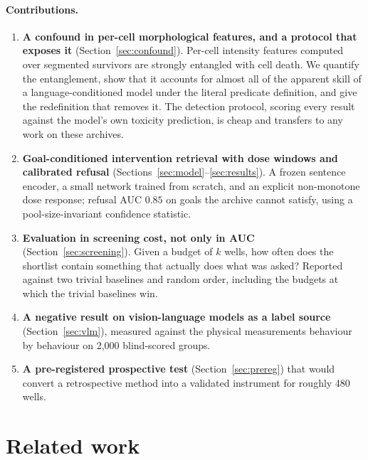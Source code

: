 \documentclass[11pt]{article}
\begin{document}
\paragraph{Contributions.}
\begin{enumerate}\itemsep0.2em
\item \textbf{A confound in per-cell morphological features, and a protocol that
exposes it} (Section~\ref{sec:confound}). Per-cell intensity features computed over
segmented survivors are strongly entangled with cell death. We quantify the
entanglement, show that it accounts for almost all of the apparent skill of a
language-conditioned model under the literal predicate definition, and give the
redefinition that removes it. The detection protocol, scoring every result against the
model's own toxicity prediction, is cheap and transfers to any work on these archives.
\item \textbf{Goal-conditioned intervention retrieval with dose windows and calibrated
refusal} (Sections~\ref{sec:model}--\ref{sec:results}). A frozen sentence encoder, a
small network trained from scratch, and an explicit non-monotone dose response; refusal
AUC $0.85$ on goals the archive cannot satisfy, using a pool-size-invariant confidence
statistic.
\item \textbf{Evaluation in screening cost, not only in AUC}
(Section~\ref{sec:screening}). Given a budget of $k$ wells, how often does the shortlist
contain something that actually does what was asked? Reported against two trivial
baselines and random order, including the budgets at which the trivial baselines win.
\item \textbf{A negative result on vision-language models as a label source}
(Section~\ref{sec:vlm}), measured against the physical measurements behaviour by
behaviour on 2{,}000 blind-scored groups.
\item \textbf{A pre-registered prospective test} (Section~\ref{sec:prereg}) that would
convert a retrospective method into a validated instrument for roughly 480 wells.
\end{enumerate}

\section{Related work}
\end{document}
